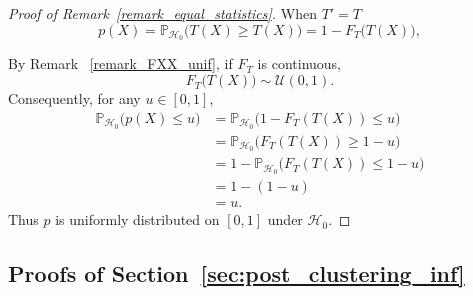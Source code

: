 \documentclass[a4paper,11pt]{article}
\theoremstyle{plain}
\newcommand{\1}{\mathbf{1}}
\begin{document}
\begin{proof}[Proof of Remark~\ref{remark_equal_statistics}]

When \(T'=T\)
\begin{equation}
p(X) = \mathbb{P}_{\mathcal{H}_0}\bigl(T(X) \ge T(X)\bigr)
      = 1 - F_T\bigl(T(X)\bigr),
\end{equation}

By Remark ~\ref{remark_FXX_unif}, if \(F_T\) is continuous,
\begin{equation*}
F_T\bigl(T(X)\bigr) \sim \mathcal{U}(0,1).
\end{equation*}
Consequently, for any \(u\in[0,1]\),
\begin{align}
\mathbb{P}_{\mathcal{H}_0}\bigl(p(X) \le u\bigr)
&= \mathbb{P}_{\mathcal{H}_0}\bigl(1 - F_T(T(X)) \le u\bigr) \\
&= \mathbb{P}_{\mathcal{H}_0}\bigl(F_T(T(X)) \ge 1-u\bigr) \\
&= 1 - \mathbb{P}_{\mathcal{H}_0}\bigl(F_T(T(X)) \le 1-u\bigr) \\
&= 1 - (1-u) \\
&= u.
\end{align}
Thus \(p\) is uniformly distributed on \([0,1]\) under \(\mathcal{H}_0\).
\end{proof}


\subsection{Proofs of Section~\ref{sec:post_clustering_inf}}
\end{document}
